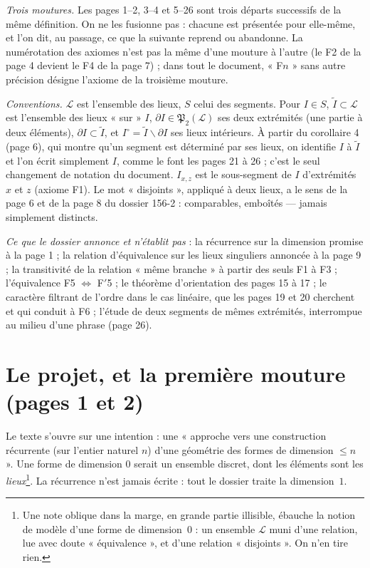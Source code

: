 \documentclass[11pt,a4paper]{article}
\begin{document}
\emph{Trois moutures.} Les pages 1--2, 3--4 et 5--26 sont trois départs
successifs de la même définition. On ne les fusionne pas : chacune est
présentée pour elle-même, et l'on dit, au passage, ce que la suivante reprend
ou abandonne. La numérotation des axiomes n'est pas la même d'une mouture à
l'autre (le F2 de la page 4 devient le F4 de la page 7) ; dans tout le
document, « F$n$ » sans autre précision désigne l'axiome de la troisième
mouture.

\emph{Conventions.} $\mathcal{L}$ est l'ensemble des lieux, $S$ celui des
segments. Pour $I \in S$, $\widetilde{I} \subset \mathcal{L}$ est l'ensemble
des lieux « sur » $I$, $\partial I \in \mathfrak{P}_{2}(\mathcal{L})$ ses deux
extrémités (une partie à deux éléments), $\partial I \subset \widetilde{I}$,
et $I^{\circ} = \widetilde{I} \smallsetminus \partial I$ ses lieux intérieurs.
À partir du corollaire 4 (page 6), qui montre qu'un segment est déterminé par
ses lieux, on identifie $I$ à $\widetilde{I}$ et l'on écrit simplement $I$,
comme le font les pages 21 à 26 ; c'est le seul changement de notation du
document. $I_{x,z}$ est le sous-segment de $I$ d'extrémités $x$ et $z$
(axiome F1). Le mot « disjoints », appliqué à deux lieux, a le sens de la page
6 et de la page 8 du dossier 156-2 : comparables, emboîtés --- jamais
simplement distincts.

\emph{Ce que le dossier annonce et n'établit pas} : la récurrence sur la
dimension promise à la page 1 ; la relation d'équivalence sur les lieux
singuliers annoncée à la page 9 ; la transitivité de la relation « même
branche » à partir des seuls F1 à F3 ; l'équivalence F5 $\Leftrightarrow$
F$'$5 ; le théorème d'orientation des pages 15 à 17 ; le caractère filtrant
de l'ordre dans le cas linéaire, que les pages 19 et 20 cherchent et qui
conduit à F6 ; l'étude de deux segments de mêmes extrémités, interrompue au
milieu d'une phrase (page 26).

\section*{Le projet, et la première mouture (pages 1 et 2)}

Le texte s'ouvre sur une intention : une « approche vers une construction
récurrente (sur l'entier naturel $n$) d'une géométrie des formes de dimension
$\leq n$ ». Une forme de dimension $0$ serait un ensemble discret, dont les
éléments sont les \emph{lieux}\footnote{Une note oblique dans la marge, en
grande partie illisible, ébauche la notion de modèle d'une forme de
dimension~$0$ : un ensemble $\mathcal{L}$ muni d'une relation, lue avec doute
« équivalence », et d'une relation « disjoints ». On n'en tire rien.}. La
récurrence n'est jamais écrite : tout le dossier traite la dimension~$1$.
\end{document}
